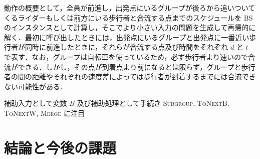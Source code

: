 \documentclass[11pt,a4paper]{jarticle}
\begin{document}
動作の概要として，全員が前進し，出発点にいるグループが後ろから追いついてくるライダーもしくは前方にいる歩行者と合流する点までのスケジュールを BS のインスタンスとして計算し，そこでより小さい入力の問題を生成して再帰的に解く．最初に呼び出したときには，出発点にいるグループと出発点に一番近い歩行者が同時に前進したときに，それらが合流する点及び時間をそれぞれ $d$ と $t$ で表す．なお，グループは自転車を使っているため，必ず歩行者より速いので合流ができる．しかし，その点が到着点より前になるとは限らず，グループと歩行者の間の距離やそれぞれの速度差によっては歩行者が到着するまでには合流できない可能性がある．

補助入力として変数 $B$ 及び補助処理として手続き \textsc{Subgroup}, \textsc{ToNextB}, \textsc{ToNextW}, \textsc{Merge} に注目


\section{結論と今後の課題}

\end{document}
